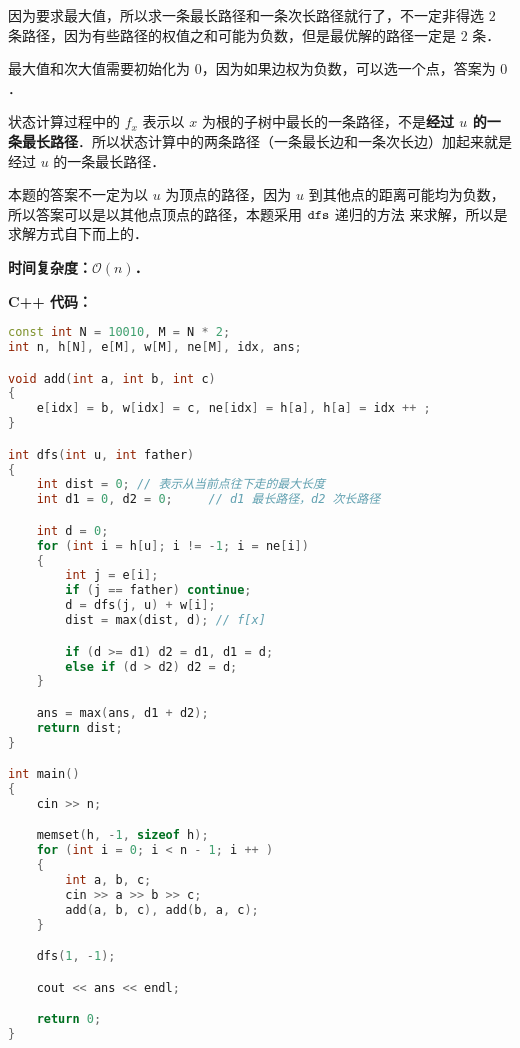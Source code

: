 因为要求最大值，所以求一条最长路径和一条次长路径就行了，不一定非得选 $2$ 条路径，因为有些路径的权值之和可能为负数，但是最优解的路径一定是 $2$ 条．

最大值和次大值需要初始化为 $0$，因为如果边权为负数，可以选一个点，答案为 $0$．

状态计算过程中的 $f_x$ 表示以 $x$ 为根的子树中最长的一条路径，不是\textbf{经过 $u$ 的一条最长路径}．所以状态计算中的两条路径（一条最长边和一条次长边）加起来就是经过 $u$ 的一条最长路径．

本题的答案不一定为以 $u$ 为顶点的路径，因为 $u$ 到其他点的距离可能均为负数，所以答案可以是以其他点顶点的路径，本题采用 $\tt dfs$ 递归的方法 来求解，所以是求解方式自下而上的．

\textbf{时间复杂度：$\mathcal{O}(n)$．}

\textbf{C++ 代码：}

\begin{lstlisting}[language=cpp]
const int N = 10010, M = N * 2;
int n, h[N], e[M], w[M], ne[M], idx, ans;

void add(int a, int b, int c)
{
    e[idx] = b, w[idx] = c, ne[idx] = h[a], h[a] = idx ++ ;
}

int dfs(int u, int father)
{
    int dist = 0; // 表示从当前点往下走的最大长度
    int d1 = 0, d2 = 0;     // d1 最长路径，d2 次长路径

    int d = 0;
    for (int i = h[u]; i != -1; i = ne[i])
    {
        int j = e[i];
        if (j == father) continue;
        d = dfs(j, u) + w[i];
        dist = max(dist, d); // f[x]

        if (d >= d1) d2 = d1, d1 = d;
        else if (d > d2) d2 = d;
    }

    ans = max(ans, d1 + d2);
    return dist;
}

int main()
{
    cin >> n;

    memset(h, -1, sizeof h);
    for (int i = 0; i < n - 1; i ++ )
    {
        int a, b, c;
        cin >> a >> b >> c;
        add(a, b, c), add(b, a, c);
    }

    dfs(1, -1);

    cout << ans << endl;

    return 0;
}
\end{lstlisting}